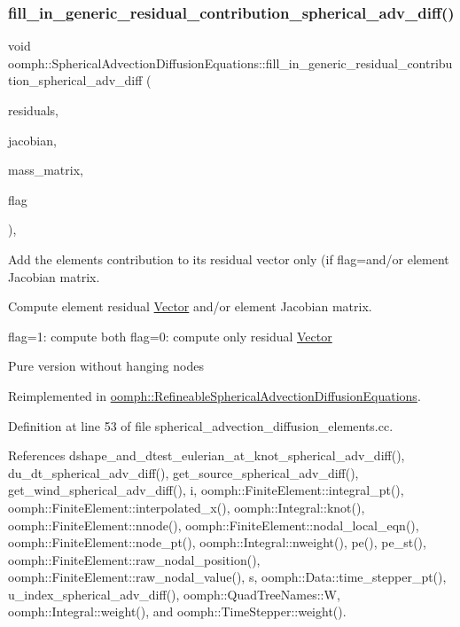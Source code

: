 \subsubsection{\texorpdfstring{fill\+\_\+in\+\_\+generic\+\_\+residual\+\_\+contribution\+\_\+spherical\+\_\+adv\+\_\+diff()}{fill\_in\_generic\_residual\_contribution\_spherical\_adv\_diff()}}
{\footnotesize\ttfamily void oomph\+::\+Spherical\+Advection\+Diffusion\+Equations\+::fill\+\_\+in\+\_\+generic\+\_\+residual\+\_\+contribution\+\_\+spherical\+\_\+adv\+\_\+diff (\begin{DoxyParamCaption}\item[{\hyperlink{classoomph_1_1Vector}{Vector}$<$ double $>$ \&}]{residuals,  }\item[{\hyperlink{classoomph_1_1DenseMatrix}{Dense\+Matrix}$<$ double $>$ \&}]{jacobian,  }\item[{\hyperlink{classoomph_1_1DenseMatrix}{Dense\+Matrix}$<$ double $>$ \&}]{mass\+\_\+matrix,  }\item[{unsigned}]{flag }\end{DoxyParamCaption})\hspace{0.3cm}{\ttfamily [protected]}, {\ttfamily [virtual]}}



Add the element\textquotesingle{}s contribution to its residual vector only (if flag=and/or element Jacobian matrix. 

Compute element residual \hyperlink{classoomph_1_1Vector}{Vector} and/or element Jacobian matrix.

flag=1\+: compute both flag=0\+: compute only residual \hyperlink{classoomph_1_1Vector}{Vector}

Pure version without hanging nodes 

Reimplemented in \hyperlink{classoomph_1_1RefineableSphericalAdvectionDiffusionEquations_a08a48e0e7e544ec61f4adde6c5e41211}{oomph\+::\+Refineable\+Spherical\+Advection\+Diffusion\+Equations}.



Definition at line 53 of file spherical\+\_\+advection\+\_\+diffusion\+\_\+elements.\+cc.



References dshape\+\_\+and\+\_\+dtest\+\_\+eulerian\+\_\+at\+\_\+knot\+\_\+spherical\+\_\+adv\+\_\+diff(), du\+\_\+dt\+\_\+spherical\+\_\+adv\+\_\+diff(), get\+\_\+source\+\_\+spherical\+\_\+adv\+\_\+diff(), get\+\_\+wind\+\_\+spherical\+\_\+adv\+\_\+diff(), i, oomph\+::\+Finite\+Element\+::integral\+\_\+pt(), oomph\+::\+Finite\+Element\+::interpolated\+\_\+x(), oomph\+::\+Integral\+::knot(), oomph\+::\+Finite\+Element\+::nnode(), oomph\+::\+Finite\+Element\+::nodal\+\_\+local\+\_\+eqn(), oomph\+::\+Finite\+Element\+::node\+\_\+pt(), oomph\+::\+Integral\+::nweight(), pe(), pe\+\_\+st(), oomph\+::\+Finite\+Element\+::raw\+\_\+nodal\+\_\+position(), oomph\+::\+Finite\+Element\+::raw\+\_\+nodal\+\_\+value(), s, oomph\+::\+Data\+::time\+\_\+stepper\+\_\+pt(), u\+\_\+index\+\_\+spherical\+\_\+adv\+\_\+diff(), oomph\+::\+Quad\+Tree\+Names\+::W, oomph\+::\+Integral\+::weight(), and oomph\+::\+Time\+Stepper\+::weight().



